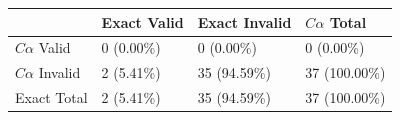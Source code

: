 \begin{tabular}{llll}
\toprule
 & Exact Valid & Exact Invalid & $C\alpha$ Total \\
\midrule
$C\alpha$ Valid & 0 (0.00\%) & 0 (0.00\%) & 0 (0.00\%) \\
$C\alpha$ Invalid & 2 (5.41\%) & 35 (94.59\%) & 37 (100.00\%) \\
Exact Total & 2 (5.41\%) & 35 (94.59\%) & 37 (100.00\%) \\
\bottomrule
\end{tabular}
